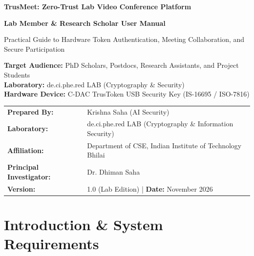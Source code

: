 \documentclass[11pt,a4paper]{report}
\begin{document}
\begin{titlepage}
    \centering
    \vspace*{1.5cm}
    
    {\Huge\bfseries\color{cdacblue} TrusMeet: Zero-Trust Lab Video Conference Platform\par}
    \vspace{0.8cm}
    {\LARGE\bfseries\color{darkgray} Lab Member \& Research Scholar User Manual\par}
    \vspace{0.4cm}
    {\large Practical Guide to Hardware Token Authentication, Meeting Collaboration, and Secure Participation\par}
    
    \vspace{2.5cm}
    \begin{tcolorbox}[colback=lightgray,colframe=cdacblue,width=0.9\textwidth,arc=2mm]
    \centering
    \textbf{Target Audience:} PhD Scholars, Postdocs, Research Assistants, and Project Students\\
    \textbf{Laboratory:} de.ci.phe.red LAB (Cryptography \& Security)\\
    \textbf{Hardware Device:} C-DAC TrusToken USB Security Key (IS-16695 / ISO-7816)
    \end{tcolorbox}
    
    \vspace{2.5cm}
    \begin{tabular}{ll}
    \textbf{Prepared By:} & Krishna Saha (AI Security) \\
    \textbf{Laboratory:} & de.ci.phe.red LAB (Cryptography \& Information Security) \\
    \textbf{Affiliation:} & Department of CSE, Indian Institute of Technology Bhilai \\
    \textbf{Principal Investigator:} & Dr. Dhiman Saha \\
    \textbf{Version:} & 1.0 (Lab Edition) \quad | \quad \textbf{Date:} November 2026
    \end{tabular}
    
    \vfill
\end{titlepage}

\tableofcontents
\newpage

\chapter{Introduction \& System Requirements}
\end{document}

